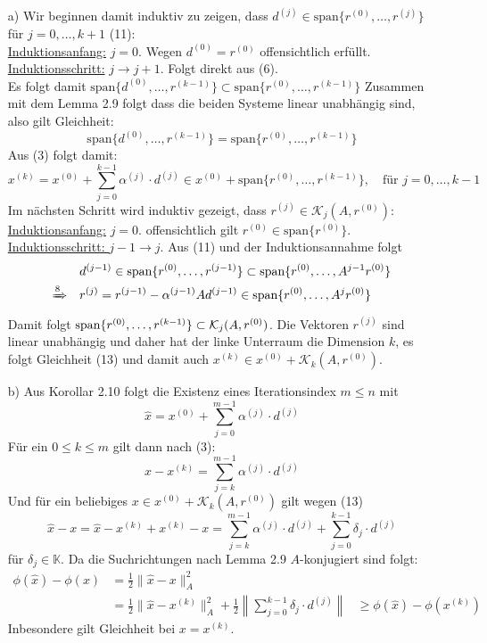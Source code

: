 \documentclass{article}
\begin{document}
    \begin{enumerate}
        \item[a)] Wir beginnen damit induktiv zu zeigen, dass $d^{(j)}\in\text{span}\{r^{(0)}, \dotsc, r^{(j)}\}$ 
        für $j=0,\dotsc,k+1$ (11): \\
        \underline{Induktionsanfang:} $j=0$. Wegen $d^{(0)}=r^{(0)}$ offensichtlich erfüllt.  \\
        \underline{Induktionsschritt:} $j\rightarrow j+1$. Folgt direkt aus (6). \\
        Es folgt damit $\text{span}\{d^{(0)}, \dotsc, r^{(k-1)}\}\subset\text{span}\{r^{(0)}, \dotsc, r^{(k-1)}\}$
        Zusammen mit dem Lemma 2.9 folgt dass die beiden Systeme linear unabhängig sind, also gilt Gleichheit:
        \[\text{span}\{d^{(0)}, \dotsc, r^{(k-1)}\} = \text{span}\{r^{(0)}, \dotsc, r^{(k-1)}\} \tag{12}\]
        Aus (3) folgt damit:
        \[x^{(k)} = x^{(0)} + \sum_{j=0}^{k-1} \alpha^{(j)}\cdot d^{(j)} 
        \in x^{(0)} + \text{span}\{r^{(0)}, \dotsc, r^{(k-1)}\},\quad\text{für } j=0,\dotsc,k-1\]
        Im nächsten Schritt wird induktiv gezeigt, dass $r^{(j)}\in \mathcal{K}_j(A,r^{(0)})$: \\
        \underline{Induktionsanfang:} $j=0$. offensichtlich gilt $r^{(0)}\in\text{span}\{r^{(0)}\}$. \\
        \underline{Induktionsschritt: } $j-1\rightarrow j$. Aus (11) und der Induktionsannahme folgt 
        \begin{align*}
        &d^{(j-1)}\in\text{span}\{r^{(0)}, \dotsc, r^{(j-1)}\}\subset \text{span}\{r^{(0)}, \dotsc, A^{j-1}r^{(0)}\}\\
        \xRightarrow{8}\quad& r^{(j)} = r^{(j-1)}-\alpha^{(j-1)}Ad^{(j-1)}
        \in \text{span}\{r^{(0)}, \dotsc, A^{j}r^{(0)}\}
        \end{align*}
        Damit folgt $\text{span}\{r^{(0)},\dotsc,r^{(k-1)}\}\subset \mathcal{K}_j(A,r^{(0)})$. 
        Die Vektoren $r^{(j)}$ sind linear unabhängig und daher hat der linke Unterraum die Dimension $k$, 
        es folgt Gleichheit (13) und damit auch $x^{(k)}\in x^{(0)} + \mathcal{K}_k(A,r^{(0)})$.
        \item[b)] Aus Korollar 2.10 folgt die Existenz eines Iterationsindex $m\leq n$ mit 
        \[\hat{x} = x^{(0)} + \sum_{j=0}^{m-1} \alpha^{(j)}\cdot d^{(j)}\]
        Für ein $0\leq k\leq m$ gilt dann nach (3):
        \[\hat{x}-x^{(k)} = \sum_{j=k}^{m-1} \alpha^{(j)}\cdot d^{(j)}\]
        Und für ein beliebiges $x\in x^{(0)} + \mathcal{K}_k(A,r^{(0)})$ gilt wegen (13)
        \[\hat{x}-x = \hat{x}-x^{(k)}+x^{(k)}-x = 
        \sum_{j=k}^{m-1}\alpha^{(j)}\cdot d^{(j)} + \sum_{j=0}^{k-1}\delta_j\cdot d^{(j)}\]
        für $\delta_j\in\mathbb{K}$. Da die Suchrichtungen nach Lemma 2.9 $A$-konjugiert sind folgt:
        \begin{align*}
            \phi(\hat{x})-\phi(x) &= \tfrac{1}{2}\|\hat{x}-x\|_A^2 \\
            &= \tfrac{1}{2}\|\hat{x}-x^{(k)}\|_A^2 + \tfrac{1}{2}\left\|\sum_{j=0}^{k-1}\delta_j\cdot d^{(j)}\right\|
            &\geq \phi(\hat{x})-\phi(x^{(k)}) 
        \end{align*}
        Inbesondere gilt Gleichheit bei $x=x^{(k)}$.
    \end{enumerate}
\end{document}

